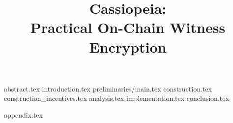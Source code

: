 \documentclass[runningheads]{llncs}
\begin{document}
\title{Cassiopeia:\\
Practical On-Chain Witness Encryption
}
\author{}
\institute{}

\maketitle              %

{abstract.tex}
{introduction.tex}
{preliminaries/main.tex}
{construction.tex}
{construction_incentives.tex}
{analysis.tex}
{implementation.tex}
{conclusion.tex}

\nocite{momo}


{appendix.tex}
\end{document}

